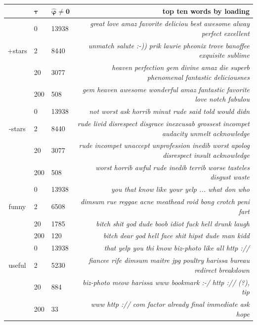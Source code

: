 \documentclass[12pt]{article}
\newcommand{\bs}[1]{\boldsymbol{#1}}
\begin{document}
\begin{table}[htb]\vspace{-.5cm}
\footnotesize{}
\hspace{-.25cm}
\begin{tabular}{cll|r}
& \small $\bs{\tau}$ & \small $\bs{\hat\varphi \neq 0}$ & \small {\bf top ten words by loading}\\
\hline
 & 0 &  13938 & \footnotesize\it great love amaz favorite deliciou best awesome alway perfect excellent \\
\small +stars & 2 & 8440 & \footnotesize\it  unmatch salute :-)) prik laurie pheonix trove banoffee exquisite sublime \\
 & 20 & 3077 & \footnotesize\it  heaven perfection gem divine amaz die superb phenomenal fantastic deliciousnes \\
 & 200 & 508 & \footnotesize\it  gem heaven awesome wonderful amaz fantastic favorite love notch fabulou \\
\hline
 & 0 &  13938 & \footnotesize\it  not worst ask horrib minut rude said told would didn \\
\small -stars & 2 & 8440 & \footnotesize\it  rude livid disrespect disgrace inexcusab grossest incompet audacity unmelt acknowledge \\
 & 20 & 3077 & \footnotesize\it  rude incompet unaccept unprofession inedib worst apolog disrespect insult acknowledge \\
 & 200 & 508 & \footnotesize\it  worst horrib awful rude inedib terrib worse tasteles disgust waste \\
\hline
 & 0 &  13938 & \footnotesize\it  you that know like your yelp ... what don who \\
\small funny & 2 & 6508 & \footnotesize\it  dimsum rue reggae acne meathead roid bong crotch peni fart \\
 & 20 & 1785 & \footnotesize\it  bitch shit god dude boob idiot fuck hell drunk laugh \\
 & 200 & 120 & \footnotesize\it  bitch dear god hell face shit hipst dude man kidd \\
\hline
 & 0 & 13938 & \footnotesize\it  that yelp you thi know biz-photo like all http :// \\
\small useful & 2 & 5230 & \footnotesize\it  fiancee rife dimsum maitre jpg poultry harissa bureau redirect breakdown \\
 & 20 & 884 & \footnotesize\it  biz-photo meow harissa www bookmark :-/ http :// (?), tip \\
 & 200 & 33 & \footnotesize\it  www http :// com factor already final immediate ask hope \\

\end{tabular}
\end{table}
\end{document}
